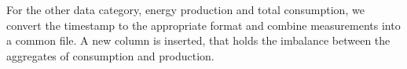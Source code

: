 \documentclass{article}
\begin{document}
\begin{multicols}{3}

For the other data category, energy production and total consumption, we convert the timestamp to the appropriate format and combine measurements into a common file.
A new column is inserted, that holds the imbalance between the aggregates of consumption and production. 


\end{multicols}
\end{document}
